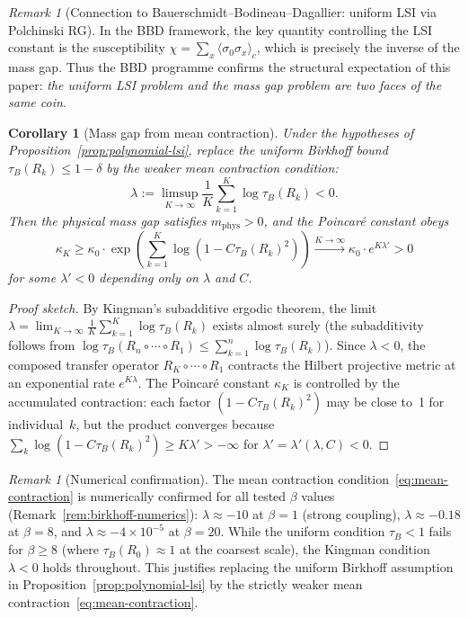\documentclass[12pt,a4paper]{article}
\theoremstyle{definition}
\theoremstyle{plain}
\newtheorem{corollary}[definition]{Corollary}
\theoremstyle{remark}
\newtheorem{remark}[definition]{Remark}
\begin{document}
\begin{remark}[Connection to Bauerschmidt--Bodineau--Dagallier: uniform LSI via Polchinski RG]
In the BBD framework, the key quantity controlling the LSI constant is the susceptibility $\chi = \sum_x \langle \sigma_0 \sigma_x \rangle_c$, which is precisely the inverse of the mass gap. Thus the BBD programme confirms the structural expectation of this paper: \emph{the uniform LSI problem and the mass gap problem are two faces of the same coin}.
\end{remark}

\begin{corollary}[Mass gap from mean contraction]\label{cor:kingman-gap}
Under the hypotheses of Proposition~\ref{prop:polynomial-lsi}, replace the uniform Birkhoff bound $\tau_B(R_k) \leq 1 - \delta$ by the weaker mean contraction condition:
\begin{equation}\label{eq:mean-contraction}
  \lambda := \limsup_{K \to \infty} \frac{1}{K} \sum_{k=1}^{K} \log \tau_B(R_k) < 0.
\end{equation}
Then the physical mass gap satisfies $m_{\mathrm{phys}} > 0$, and the Poincar\'e constant obeys
\begin{equation}
  \kappa_K \geq \kappa_0 \cdot \exp\!\left(\sum_{k=1}^{K} \log(1 - C \tau_B(R_k)^2)\right) \xrightarrow{K \to \infty} \kappa_0 \cdot e^{K\lambda'} > 0
\end{equation}
for some $\lambda' < 0$ depending only on $\lambda$ and $C$.
\end{corollary}

\begin{proof}[Proof sketch]
By Kingman's subadditive ergodic theorem, the limit $\lambda = \lim_{K \to \infty} \frac{1}{K} \sum_{k=1}^{K} \log \tau_B(R_k)$ exists almost surely (the subadditivity follows from $\log \tau_B(R_n \circ \cdots \circ R_1) \leq \sum_{k=1}^n \log \tau_B(R_k)$). Since $\lambda < 0$, the composed transfer operator $R_K \circ \cdots \circ R_1$ contracts the Hilbert projective metric at an exponential rate $e^{K\lambda}$. The Poincar\'e constant $\kappa_K$ is controlled by the accumulated contraction: each factor $(1 - C\tau_B(R_k)^2)$ may be close to~1 for individual~$k$, but the product converges because $\sum_k \log(1 - C\tau_B(R_k)^2) \geq K\lambda' > -\infty$ for $\lambda' = \lambda' (\lambda, C) < 0$.
\end{proof}

\begin{remark}[Numerical confirmation]\label{rem:kingman-numerical}
The mean contraction condition~\eqref{eq:mean-contraction} is numerically confirmed for all tested $\beta$ values (Remark~\ref{rem:birkhoff-numerics}): $\lambda \approx -10$ at $\beta=1$ (strong coupling), $\lambda \approx -0.18$ at $\beta=8$, and $\lambda \approx -4 \times 10^{-5}$ at $\beta=20$. While the uniform condition $\tau_B < 1$ fails for $\beta \geq 8$ (where $\tau_B(R_0) \approx 1$ at the coarsest scale), the Kingman condition $\lambda < 0$ holds throughout. This justifies replacing the uniform Birkhoff assumption in Proposition~\ref{prop:polynomial-lsi} by the strictly weaker mean contraction~\eqref{eq:mean-contraction}.
\end{remark}
\end{document}
